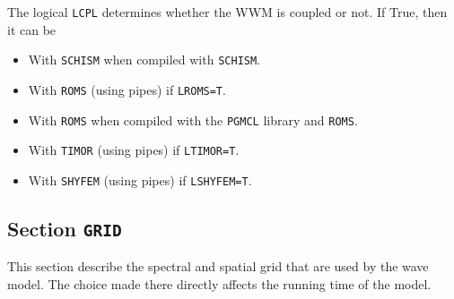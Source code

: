 \documentclass[12pt]{amsart}
\begin{document}
The logical {\tt LCPL} determines whether the WWM is coupled or not.
If True, then it can be
\begin{itemize}
\item With {\tt SCHISM} when compiled with {\tt SCHISM}.
\item With {\tt ROMS} (using pipes) if {\tt LROMS=T}.
\item With {\tt ROMS} when compiled with the {\tt PGMCL} library and {\tt ROMS}.
\item With {\tt TIMOR} (using pipes) if {\tt LTIMOR=T}.
\item With {\tt SHYFEM} (using pipes) if {\tt LSHYFEM=T}.
\end{itemize}



\newpage

\subsection{Section {\tt GRID}}
This section describe the spectral and spatial grid that are used by the wave model.
The choice made there directly affects the running time of the model.
\end{document}
